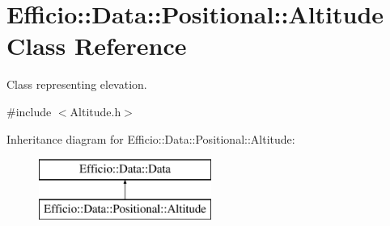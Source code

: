 \hypertarget{class_efficio_1_1_data_1_1_positional_1_1_altitude}{}\section{Efficio\+:\+:Data\+:\+:Positional\+:\+:Altitude Class Reference}
\label{class_efficio_1_1_data_1_1_positional_1_1_altitude}


Class representing elevation.  




{\ttfamily \#include $<$Altitude.\+h$>$}

Inheritance diagram for Efficio\+:\+:Data\+:\+:Positional\+:\+:Altitude\+:\begin{figure}[H]
\begin{center}
\leavevmode
\includegraphics[height=2.000000cm]{class_efficio_1_1_data_1_1_positional_1_1_altitude}
\end{center}
\end{figure}
